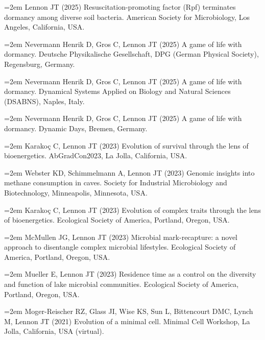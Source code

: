 \documentclass[11pt]{article}
\begin{document}
{\setlength{\parskip}{0.3em}  %

\hangindent=2em Lennon JT (2025) Resuscitation-promoting factor (Rpf) terminates dormancy among diverse soil bacteria. American Society for Microbiology, Los Angeles, California, USA. \par

\hangindent=2em Nevermann Henrik D, Gros C, Lennon JT (2025) A game of life with dormancy. Deutsche Physikalische Gesellschaft, DPG (German Physical Society), Regensburg, Germany. \par

\hangindent=2em Nevermann Henrik D, Gros C, Lennon JT (2025) A game of life with dormancy. Dynamical Systems Applied on Biology and Natural Sciences (DSABNS), Naples, Italy. \par

\hangindent=2em Nevermann Henrik D, Gros C, Lennon JT (2025) A game of life with dormancy. Dynamic Days, Bremen, Germany. \par

\hangindent=2em Karakoç C, Lennon JT (2023) Evolution of survival through the lens of bioenergetics. AbGradCon2023, La Jolla, California, USA. \par

\hangindent=2em Webster KD, Schimmelmann A, Lennon JT (2023) Genomic insights into methane consumption in caves. Society for Industrial Microbiology and Biotechnology, Minneapolis, Minnesota, USA. \par

\hangindent=2em Karakoç C, Lennon JT (2023) Evolution of complex traits through the lens of bioenergetics. Ecological Society of America, Portland, Oregon, USA. \par

\hangindent=2em McMullen JG, Lennon JT (2023) Microbial mark-recapture: a novel approach to disentangle complex microbial lifestyles. Ecological Society of America, Portland, Oregon, USA. \par


\hangindent=2em Mueller E, Lennon JT (2023) Residence time as a control on the diversity and function of lake microbial communities. Ecological Society of America, Portland, Oregon, USA. \par

\hangindent=2em Moger-Reischer RZ, Glass JI, Wise KS, Sun L, Bittencourt DMC, Lynch M, Lennon JT (2021) Evolution of a minimal cell. Minimal Cell Workshop, La Jolla, California, USA (virtual). \par

}
\end{document}
